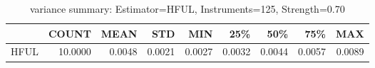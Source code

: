\begin{table}[ht]
\centering
\caption{variance summary: Estimator=HFUL, Instruments=125, Strength=0.70}
\begin{tabular}{lrrrrrrrr}
\toprule
 & COUNT & MEAN & STD & MIN & 25\% & 50\% & 75\% & MAX \\
\midrule
HFUL & 10.0000 & 0.0048 & 0.0021 & 0.0027 & 0.0032 & 0.0044 & 0.0057 & 0.0089 \\
\bottomrule
\end{tabular}
\end{table}
